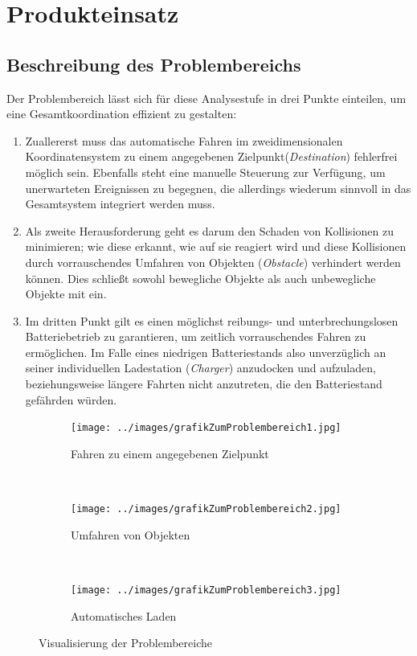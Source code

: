 
	\section{Produkteinsatz}

		\subsection{Beschreibung des Problembereichs}
		Der Problembereich lässt sich für diese Analysestufe in drei Punkte einteilen, um eine Gesamtkoordination effizient zu gestalten:

		\begin{enumerate}
		\item
			Zuallererst muss das automatische Fahren im zweidimensionalen
			Koordinatensystem zu einem angegebenen Zielpunkt(\emph{Destination})
			fehlerfrei möglich sein. Ebenfalls steht eine manuelle Steuerung zur
			Verfügung, um unerwarteten Ereignissen zu begegnen, die allerdings
			wiederum sinnvoll in das Gesamtsystem integriert werden muss.
		\item
			Als zweite Herausforderung geht es darum den Schaden von Kollisionen
			zu minimieren; wie diese erkannt, wie auf sie reagiert wird und diese
			Kollisionen durch vorrauschendes Umfahren von
			Objekten (\emph{Obstacle}) verhindert werden können. Dies schließt
			sowohl bewegliche Objekte als auch unbewegliche Objekte mit ein.
		\item
			Im dritten Punkt gilt es einen möglichst reibungs- und
			unterbrechungslosen Batteriebetrieb zu garantieren, um zeitlich
			vorrauschendes Fahren zu ermöglichen. Im Falle eines niedrigen
			Batteriestands also unverzüglich an seiner individuellen Ladestation
			(\emph{Charger}) anzudocken und aufzuladen, beziehungsweise längere
			Fahrten nicht anzutreten, die den Batteriestand gefährden würden.
		\end{enumerate}

		\begin{figure}[H]
			\centering
			\begin{subfigure}[t]{0.3\textwidth}
				\texttt{[image: ../images/grafikZumProblembereich1.jpg]}
				\caption{Fahren zu einem angegebenen Zielpunkt}
				\label{fig:2-1-problembereich-1}
			\end{subfigure}
			~~~~
			\begin{subfigure}[t]{0.3\textwidth}
				\texttt{[image: ../images/grafikZumProblembereich2.jpg]}
				\caption{Umfahren von Objekten}
				\label{fig:2-1-problembereich-2}
			\end{subfigure}
			~~~~
			\begin{subfigure}[t]{0.3\textwidth}
				\texttt{[image: ../images/grafikZumProblembereich3.jpg]}
				\caption{Automatisches Laden}
				\label{fig:2-1-problembereich-3}
			\end{subfigure}
			\caption{Visualisierung der Problembereiche}\label{fig:2-1-problembereiche}
		\end{figure}


